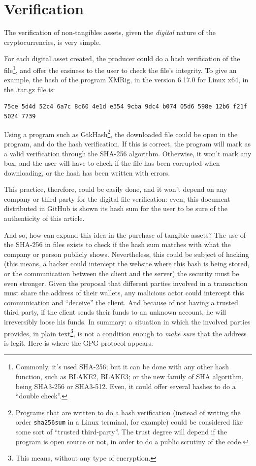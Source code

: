 \documentclass[12pt,a4paper]{article}
\begin{document}
\section{Verification}
The verification of non-tangibles assets, given the \textit{digital} nature of the cryptocurrencies, is very simple.

For each digital asset created, the producer could do a hash verification of the file\footnote{Commonly, it's used SHA-256; but it can be done with any other hash function, such as BLAKE2, BLAKE3; or the new family of SHA algorithm, being SHA3-256 or SHA3-512. Even, it could offer several hashes to do a “double check”.}, and offer the easiness to the user to check the file's integrity. To give an example, the hash of the program XMRig, in the version 6.17.0 for Linux x64, in the .tar.gz file is:

\begin{center}
\texttt{75ce 5d4d 52c4 6a7c 8c60 4e1d e354 9cba 9dc4 b074 05d6 598e 12b6 f21f 5024 7739}
\end{center}

Using a program such as GtkHash\footnote{Programs that are written to do a hash verification (instead of writing the order \texttt{sha256sum} in a Linux terminal, for example) could be considered like some sort of “trusted third-party”. The trust degree will depend if the program is open source or not, in order to do a public scrutiny of the code.}, the downloaded file could be open in the program, and do the hash verification. If this is correct, the program will mark as a valid verification through the SHA-256 algorithm. Otherwise, it won't mark any box, and the user will have to check if the file has been corrupted when downloading, or the hash has been written with errors.

This practice, therefore, could be easily done, and it won't depend on any company or third party for the digital file verification: even, this document distributed in GitHub is shown its hash sum for the user to be sure of the authenticity of this article.

And so, how can expand this idea in the purchase of tangible assets? The use of the SHA-256 in files exists to check if the hash sum matches with what the company or person publicly shows. Nevertheless, this could be subject of hacking (this means, a hacker could intercept the website where this hash is being stored, or the communication between the client and the server) the security must be even stronger. Given the proposal that different parties involved in a transaction must share the address of their wallets, any malicious actor could intercept this communication and “deceive” the client. And because of not having a trusted third party, if the client sends their funds to an unknown account, he will irreversibly loose his funds. In summary: a situation in which the involved parties provides, in plain text\footnote{This means, without any type of encryption.}, is not a condition enough to \textit{make sure} that the address is legit. Here is where the GPG protocol appears.
\end{document}
